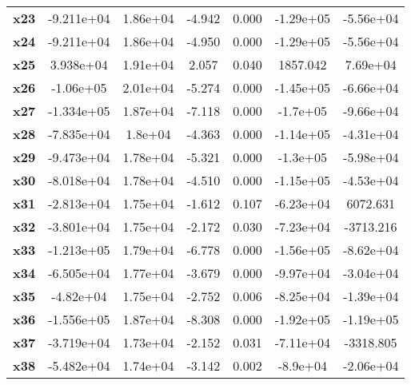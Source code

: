 \documentclass{article}
\begin{document}
\begin{center}
{\begin{tabular}{lcccccc}
\textbf{x23}   &   -9.211e+04  &     1.86e+04     &    -4.942  &         0.000        &    -1.29e+05    &    -5.56e+04     \\
\textbf{x24}   &   -9.211e+04  &     1.86e+04     &    -4.950  &         0.000        &    -1.29e+05    &    -5.56e+04     \\
\textbf{x25}   &    3.938e+04  &     1.91e+04     &     2.057  &         0.040        &     1857.042    &     7.69e+04     \\
\textbf{x26}   &    -1.06e+05  &     2.01e+04     &    -5.274  &         0.000        &    -1.45e+05    &    -6.66e+04     \\
\textbf{x27}   &   -1.334e+05  &     1.87e+04     &    -7.118  &         0.000        &     -1.7e+05    &    -9.66e+04     \\
\textbf{x28}   &   -7.835e+04  &      1.8e+04     &    -4.363  &         0.000        &    -1.14e+05    &    -4.31e+04     \\
\textbf{x29}   &   -9.473e+04  &     1.78e+04     &    -5.321  &         0.000        &     -1.3e+05    &    -5.98e+04     \\
\textbf{x30}   &   -8.018e+04  &     1.78e+04     &    -4.510  &         0.000        &    -1.15e+05    &    -4.53e+04     \\
\textbf{x31}   &   -2.813e+04  &     1.75e+04     &    -1.612  &         0.107        &    -6.23e+04    &     6072.631     \\
\textbf{x32}   &   -3.801e+04  &     1.75e+04     &    -2.172  &         0.030        &    -7.23e+04    &    -3713.216     \\
\textbf{x33}   &   -1.213e+05  &     1.79e+04     &    -6.778  &         0.000        &    -1.56e+05    &    -8.62e+04     \\
\textbf{x34}   &   -6.505e+04  &     1.77e+04     &    -3.679  &         0.000        &    -9.97e+04    &    -3.04e+04     \\
\textbf{x35}   &    -4.82e+04  &     1.75e+04     &    -2.752  &         0.006        &    -8.25e+04    &    -1.39e+04     \\
\textbf{x36}   &   -1.556e+05  &     1.87e+04     &    -8.308  &         0.000        &    -1.92e+05    &    -1.19e+05     \\
\textbf{x37}   &   -3.719e+04  &     1.73e+04     &    -2.152  &         0.031        &    -7.11e+04    &    -3318.805     \\
\textbf{x38}   &   -5.482e+04  &     1.74e+04     &    -3.142  &         0.002        &     -8.9e+04    &    -2.06e+04     \\

\end{tabular}}
\end{center}
\end{document}
